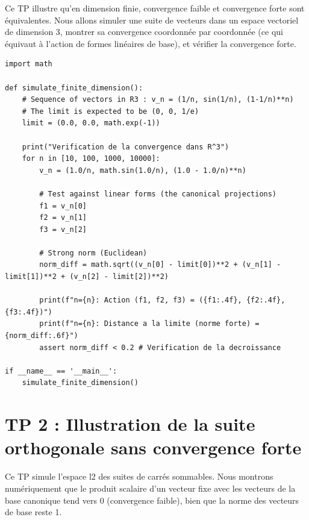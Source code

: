 \documentclass[11pt,a4paper]{article}
\begin{document}
Ce TP illustre qu'en dimension finie, convergence faible et convergence forte sont équivalentes. Nous allons simuler une suite de vecteurs dans un espace vectoriel de dimension 3, montrer sa convergence coordonnée par coordonnée (ce qui équivaut à l'action de formes linéaires de base), et vérifier la convergence forte.

\begin{lstlisting}
import math

def simulate_finite_dimension():
    # Sequence of vectors in R3 : v_n = (1/n, sin(1/n), (1-1/n)**n)
    # The limit is expected to be (0, 0, 1/e)
    limit = (0.0, 0.0, math.exp(-1))

    print("Verification de la convergence dans R^3")
    for n in [10, 100, 1000, 10000]:
        v_n = (1.0/n, math.sin(1.0/n), (1.0 - 1.0/n)**n)

        # Test against linear forms (the canonical projections)
        f1 = v_n[0]
        f2 = v_n[1]
        f3 = v_n[2]

        # Strong norm (Euclidean)
        norm_diff = math.sqrt((v_n[0] - limit[0])**2 + (v_n[1] - limit[1])**2 + (v_n[2] - limit[2])**2)

        print(f"n={n}: Action (f1, f2, f3) = ({f1:.4f}, {f2:.4f}, {f3:.4f})")
        print(f"n={n}: Distance a la limite (norme forte) = {norm_diff:.6f}")
        assert norm_diff < 0.2 # Verification de la decroissance

if __name__ == '__main__':
    simulate_finite_dimension()
\end{lstlisting}


\section{TP 2 : Illustration de la suite orthogonale sans convergence forte}

Ce TP simule l'espace l2 des suites de carrés sommables. Nous montrons numériquement que le produit scalaire d'un vecteur fixe avec les vecteurs de la base canonique tend vers 0 (convergence faible), bien que la norme des vecteurs de base reste 1.
\end{document}
